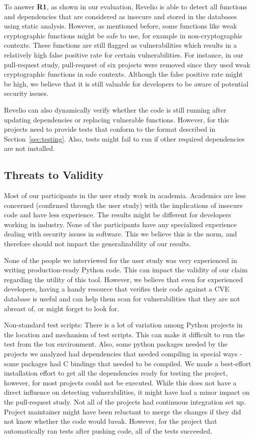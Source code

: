 To answer \textbf{R1}, as shown in our evaluation, Revelio is able to detect all functions and dependencies that are considered as insecure and stored in the databases using static analysis. However, as mentioned before, some functions like weak cryptographic functions might be safe to use, for example in non-cryptographic contexts. These functions are still flagged as vulnerabilities which results in a relatively high false positive rate for certain vulnerabilities. For instance, in our pull-request study, pull-request of six projects were removed since they used weak cryptographic functions in safe contexts. Although the false positive rate might be high, we believe that it is still valuable for developers to be aware of potential security issues. 

Revelio can also dynamically verify whether the code is still running after updating dependencies or replacing vulnerable functions. However, for this projects need to provide tests that conform to the format described in Section~\ref{sec:testing}. Also, tests might fail to run if other required dependencies are not installed. 


\subsection{Threats to Validity}

Most of our participants in the user study work in academia. Academics are less concerned (confirmed through the user study) with the implications of insecure code and have less experience. The results might be different for developers working in industry. None of the participants have any specialized experience dealing with security issues in software. This we believe this is the norm, and therefore should not impact the generalizability of our results. 

None of the people we interviewed for the user study was very experienced in writing production-ready Python code. This can impact the validity of our claim regarding the utility of this tool. However, we believe that even for experienced developers, having a handy resource that verifies their code against a CVE database is useful and can help them scan for vulnerabilities that they are not abreast of, or might forget to look for. 

Non-standard test scripts: There is a lot of variation among Python projects in the location and mechanism of test scripts. This can make it difficult to run the test from the tox environment. Also, some python packages needed by the projects we analyzed had dependencies that needed compiling in special ways - some packages had C bindings that needed to be compiled. We made a best-effort installation effort to get all the dependencies ready for testing the project, however, for most projects could not be executed. While this does not have a direct influence on detecting vulnerabilities, it might have had a minor impact on the pull-request study. Not all of the projects had continuous integration set up. Project maintainer might have been reluctant to merge the changes if they did not know whether the code would break. However, for the project that automatically ran tests after pushing code, all of the tests succeeded. 

